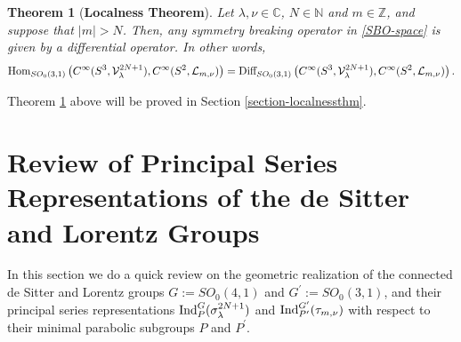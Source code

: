 \documentclass[12pt, pdflatex, a4paper]{article}
\theoremstyle{plain}
\newtheorem{thm}{Theorem}[section]
\theoremstyle{definition}
\def\C{{\mathbb C}}
\def\Diff{\text{\normalfont{Diff}}}
\def\Hom{\text{\normalfont{Hom}}}
\def\Ind{\text{\normalfont{Ind}}}
\def\L{\mathcal{L}}
\def\N{{\mathbb N}}
\def\V{\mathcal{V}}
\def\Z{{\mathbb Z}}
\begin{document}
\begin{thm}[\textbf{Localness Theorem}]\label{Localness-thm} Let $\lambda, \nu \in \C$, $N \in \N$ and $m \in \Z$, and suppose that $|m| > N$. Then, any symmetry breaking operator in \eqref{SBO-space} is given by a differential operator. In other words,
\begin{equation*}
\Hom_{SO_0(3,1)}\left(C^\infty(S^3, \V_\lambda^{2N+1}), C^\infty(S^2, \L_{m,\nu})\right) = \Diff_{SO_0(3,1)}\left(C^\infty(S^3, \V_\lambda^{2N+1}), C^\infty(S^2, \L_{m,\nu})\right).
\end{equation*}
\end{thm}

Theorem \ref{Localness-thm} above will be proved in Section \ref{section-localnessthm}.

\section{Review of Principal Series Representations of the de Sitter and Lorentz Groups}\label{section-setting}

In this section we do a quick review on the geometric realization of the connected de Sitter and Lorentz groups $G := SO_0(4,1)$ and $G^\prime := SO_0(3,1)$, and their principal series representations $\Ind_P^G(\sigma_\lambda^{2N+1})$ and $\Ind_{P^\prime}^{G^\prime}(\tau_{m, \nu})$ with respect to their minimal parabolic subgroups $P$ and $P^\prime$.
\end{document}
